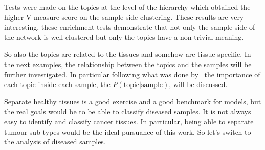 Tests were made on the topics at the level of the hierarchy which obtained the higher V-measure score on the sample side clustering. These results are very interesting, these enrichment tests demonstrate that not only the sample side of the network is well clustered but only the topics have a non-trivial meaning.

So also the topics are related to the tissues and somehow are tissue-specific. In the next examples, the relationship between the topics and the samples will be further investigated. In particular following what was done by~\cite{dey2017visualizing} the importance of each topic inside each sample, the $P(\text{topic} | \text{sample})$, will be discussed.

\FloatBarrier
Separate healthy tissues is a good exercise and a good benchmark for models, but the real goals would be to be able to classify diseased samples. It is not always easy to identify and classify cancer tissues. In particular, being able to separate tumour sub-types would be the ideal pursuance of this work. So let's switch to the analysis of diseased samples.